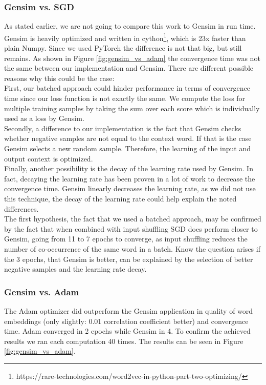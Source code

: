 \subsubsection{Gensim vs. SGD}
As stated earlier, we are not going to compare this work to Gensim in run time. Gensim is heavily optimized and written in cython\footnote{https://rare-technologies.com/word2vec-in-python-part-two-optimizing/}, which is 23x faster than plain Numpy. Since we used PyTorch the difference is not that big, but still remains. As shown in Figure \ref{fig:gensim_vs_adam} the convergence time was not the same between our implementation and Gensim. There are different possible reasons why this could be the case:\\ First, our batched approach could hinder performance in terms of convergence time since our loss function is not exactly the same. We compute the loss for multiple training samples by taking the sum over each score which is individually used as a loss by Gensim.\\ Secondly, a difference to our implementation is the fact that Gensim checks whether negative samples are not equal to the context word. If that is the case Gensim selects a new random sample. Therefore, the learning of the input and output context is optimized. \\Finally, another possibility is the decay of the learning rate used by Gensim. In fact, decaying the learning rate has been proven in a lot of work to decrease the convergence time. Gensim linearly decreases the learning rate, as we did not use this technique, the decay of the learning rate could help explain the noted differences. \\ The first hypothesis, the fact that we used a batched approach, may be confirmed by the fact that when combined with input shuffling SGD does perform closer to Gensim, going from 11 to 7 epochs to converge, as input shuffling reduces the number of co-occurrence of the same word in a batch.
Know the question arises if the 3 epochs, that Gensim is better, can be explained by the selection of better negative samples and the learning rate decay.

\subsubsection{Gensim vs. Adam}
The Adam optimizer did outperform the Gensim application in quality of word embeddings (only slightly: 0.01 correlation coefficient better) and convergence time. Adam converged in 2 epochs while Gensim in 4. To confirm the achieved results we ran each computation 40 times. The results can be seen in Figure \ref{fig:gensim_vs_adam}.

